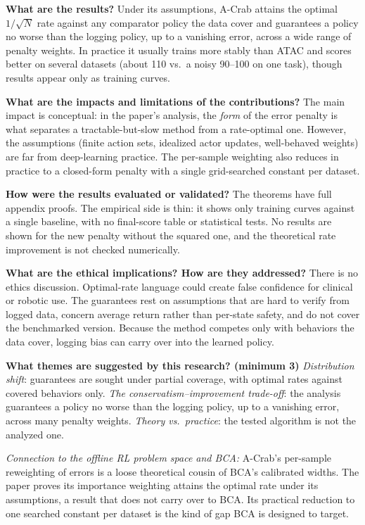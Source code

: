 \documentclass[11pt]{article}
\newcommand{\q}[2]{\item \textbf{#1} #2}
\newcommand{\tiein}[1]{\par\smallskip\noindent\emph{Connection to the offline RL problem space and BCA:} #1\par\medskip}
\begin{document}
\begin{qna}
\q{What are the results?}
Under its assumptions, A-Crab attains the optimal $1/\sqrt{N}$ rate against any comparator policy the data cover and guarantees a policy no worse than the logging policy, up to a vanishing error, across a wide range of penalty weights. In practice it usually trains more stably than ATAC and scores better on several datasets (about 110 vs.\ a noisy 90--100 on one task), though results appear only as training curves.

\q{What are the impacts and limitations of the contributions?}
The main impact is conceptual: in the paper's analysis, the \emph{form} of the error penalty is what separates a tractable-but-slow method from a rate-optimal one. However, the assumptions (finite action sets, idealized actor updates, well-behaved weights) are far from deep-learning practice. The per-sample weighting also reduces in practice to a closed-form penalty with a single grid-searched constant per dataset.

\q{How were the results evaluated or validated?}
The theorems have full appendix proofs. The empirical side is thin: it shows only training curves against a single baseline, with no final-score table or statistical tests. No results are shown for the new penalty without the squared one, and the theoretical rate improvement is not checked numerically.

\q{What are the ethical implications? How are they addressed?}
There is no ethics discussion. Optimal-rate language could create false confidence for clinical or robotic use. The guarantees rest on assumptions that are hard to verify from logged data, concern average return rather than per-state safety, and do not cover the benchmarked version. Because the method competes only with behaviors the data cover, logging bias can carry over into the learned policy.

\q{What themes are suggested by this research? (minimum 3)}
\emph{Distribution shift}: guarantees are sought under partial coverage, with optimal rates against covered behaviors only. \emph{The conservatism--improvement trade-off}: the analysis guarantees a policy no worse than the logging policy, up to a vanishing error, across many penalty weights. \emph{Theory vs.\ practice}: the tested algorithm is not the analyzed one.

\end{qna}
\tiein{A-Crab's per-sample reweighting of errors is a loose theoretical cousin of BCA's calibrated widths. The paper proves its importance weighting attains the optimal rate under its assumptions, a result that does not carry over to BCA. Its practical reduction to one searched constant per dataset is the kind of gap BCA is designed to target.}
\end{document}
